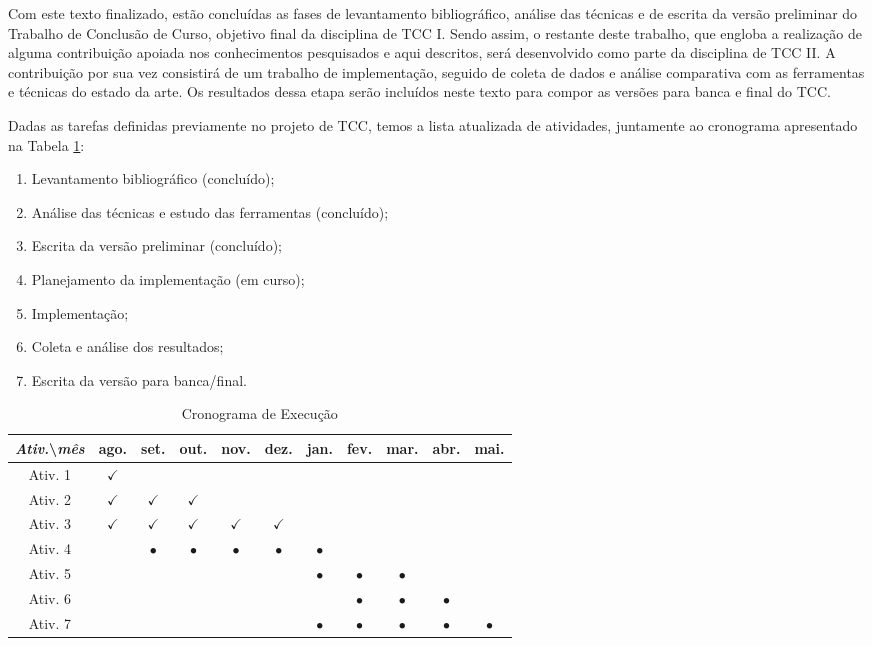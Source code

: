 \documentclass[
	12pt,				%
	openright,			%
	oneside,			%
	a4paper,			%
	tccpreliminar,			%
	]{ABNT-DC-UEL}
\begin{document}
Com este texto finalizado, estão concluídas as fases de levantamento bibliográfico, análise das técnicas e de escrita da versão preliminar do Trabalho de Conclusão de Curso, objetivo final da disciplina de TCC I. Sendo assim, o restante deste trabalho, que engloba a realização de alguma contribuição apoiada nos conhecimentos pesquisados e aqui descritos, será desenvolvido como parte da disciplina de TCC II. A contribuição por sua vez consistirá de um trabalho de implementação, seguido de coleta de dados e análise comparativa com as ferramentas e técnicas do estado da arte. Os resultados dessa etapa serão incluídos neste texto para compor as versões para banca e final do TCC.

Dadas as tarefas definidas previamente no projeto de TCC, temos a lista atualizada de atividades, juntamente ao cronograma apresentado na Tabela \ref{tab:cronograma}:

\begin{enumerate}
 \item Levantamento bibliográfico (concluído);
 \item Análise das técnicas e estudo das ferramentas (concluído);
 \item Escrita da versão preliminar (concluído);
 \item Planejamento da implementação (em curso);
 \item Implementação;
 \item Coleta e análise dos resultados;
 \item Escrita da versão para banca/final.
\end{enumerate}

\begin{table}[H] \centering
\caption{Cronograma de Execução}
\label{tab:cronograma}
\begin{tabular}{|c|c|c|c|c|c|c|c|c|c|c|}  \hline
\textit{Ativ.}\textbackslash \textit{mês} & ago. & set. & out. & nov. & dez. & jan. & fev. & mar. & abr. & mai.  \\ \hline
Ativ. 1 & $\checkmark$ & & & & & & & & & \\ \hline
Ativ. 2 & $\checkmark$ & $\checkmark$ & $\checkmark$ & & & & & & &  \\ \hline
Ativ. 3 & $\checkmark$ & $\checkmark$ & $\checkmark$ & $\checkmark$ & $\checkmark$ & & &  & & \\ \hline
Ativ. 4 & & $\bullet$ & $\bullet$ & $\bullet$ & $\bullet$ & $\bullet$ &  &  & & \\ \hline
Ativ. 5 & & & & & & $\bullet$ & $\bullet$ & $\bullet$ & & \\ \hline
Ativ. 6 & & & &  &  & & $\bullet$ & $\bullet$ & $\bullet$ & \\ \hline
Ativ. 7 & & & &  &  & $\bullet$ & $\bullet$ & $\bullet$ & $\bullet$ & $\bullet$ \\ \hline
\end{tabular}
\end{table}
\end{document}
